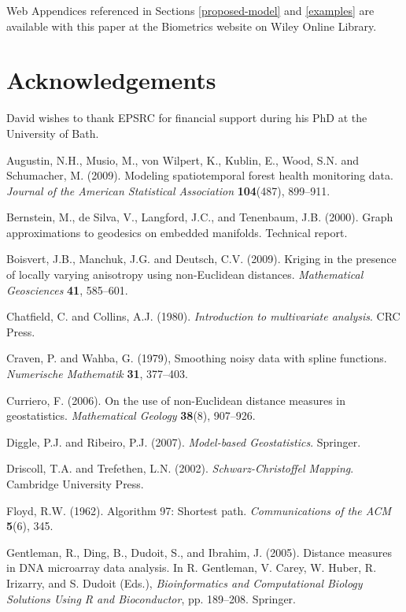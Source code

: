 \documentclass[useAMS, referee]{biom}
\begin{document}
Web Appendices referenced in Sections \ref{proposed-model} and \ref{examples} are available with this paper at the Biometrics website on Wiley Online Library.

\section*{Acknowledgements}

David wishes to thank EPSRC for financial support during his PhD at the University of Bath.

\begin{thebibliography}{99}

\bibitem{} Augustin, N.H., Musio, M., von Wilpert, K., Kublin, E., Wood, S.N. and Schumacher, M. (2009). 
Modeling spatiotemporal forest health monitoring data. \textit{Journal of the American Statistical Association} \textbf{104}(487), 899--911.

\bibitem{} Bernstein, M., de Silva, V., Langford, J.C., and Tenenbaum, J.B. (2000). Graph approximations to geodesics on embedded manifolds. Technical report.

\bibitem{} Boisvert, J.B., Manchuk,  J.G. and Deutsch, C.V. (2009). Kriging in the presence of locally varying anisotropy using non-{E}uclidean distances. \textit{Mathematical Geosciences} \textbf{41}, 585--601.

\bibitem{} Chatfield, C. and Collins, A.J. (1980). \textit{Introduction to multivariate analysis}. CRC Press.

\bibitem{} Craven, P. and Wahba, G. (1979), Smoothing noisy data with spline functions. \textit{Numerische Mathematik} \textbf{31}, 377--403.

\bibitem{} Curriero, F. (2006). On the use of non-{E}uclidean distance measures in geostatistics. \textit{Mathematical Geology} \textbf{38}(8), 907--926.

\bibitem{} Diggle, P.J. and Ribeiro, P.J. (2007). \textit{Model-based Geostatistics}. Springer.

\bibitem{} 	Driscoll, T.A. and Trefethen, L.N. (2002). \textit{Schwarz-Christoffel Mapping}. Cambridge University Press.

\bibitem{} Floyd, R.W. (1962). Algorithm 97: Shortest path. \textit{Communications of the ACM} \textbf{5}(6), 345.

\bibitem{} Gentleman, R., Ding, B., Dudoit, S., and Ibrahim, J. (2005). Distance measures in DNA microarray data analysis. In R. Gentleman, V. Carey, W. Huber, R. Irizarry, and S. Dudoit (Eds.), \textit{Bioinformatics and Computational Biology Solutions Using R and Bioconductor}, pp. 189--208. Springer.


\end{thebibliography}
\end{document}

